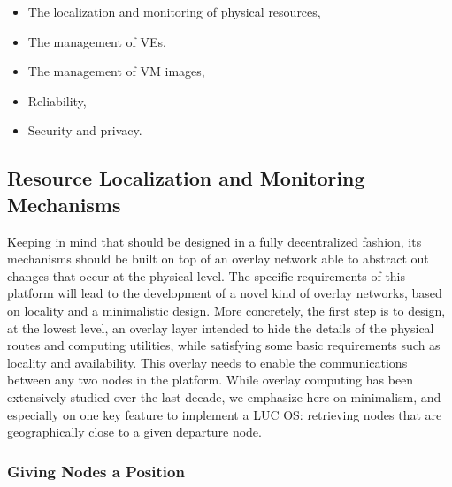 \begin{itemize}
\item The localization and monitoring of physical resources, 
\item The management of VEs, 
\item The management of VM images, 
\item Reliability,
\item Security and privacy.
\end{itemize}

\vspace*{-.4cm}
\subsection{Resource Localization and Monitoring Mechanisms\label{ssec:p2p}}

Keeping in mind that \discovery should be designed in a fully decentralized
fashion, its mechanisms should be built on top of an overlay network able to
abstract out changes that occur at the physical level. The specific requirements
of this platform will lead to the development of a novel kind of overlay
networks, based on locality and a minimalistic design.
%
More concretely, the first step is to design, at the lowest level, an overlay
layer intended to hide the details of the physical routes and computing
utilities, while satisfying some basic requirements such as locality and
availability. This overlay needs to enable the communications between any two
nodes in the platform. While overlay computing has been extensively studied over
the last decade, we emphasize here on minimalism, and especially on one key
feature to implement a LUC OS:  retrieving nodes that are geographically close
to a given departure node.

\vspace*{-.4cm}
\subsubsection*{Giving Nodes a Position}
\vspace*{-.2cm}

